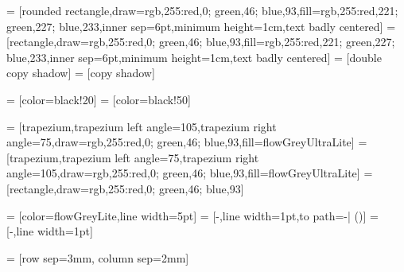 


\newcommand{\BYUblue}{rgb,255:red,0; green,46; blue,93}
\newcommand{\BYUbluelite}{rgb,255:red,221; green,227; blue,233}
\newcommand{\BYUbluemid}{rgb,255:red,151; green,169; blue,189}


 = [rounded rectangle,draw=\BYUblue,fill=\BYUbluelite,inner sep=6pt,minimum height=1cm,text badly centered]
 = [rectangle,draw=\BYUblue,fill=\BYUbluelite,inner sep=6pt,minimum height=1cm,text badly centered]
 = [double copy shadow]
 = [copy shadow]

 = [color=black!20]
 = [color=black!50]

 = [trapezium,trapezium left angle=105,trapezium right angle=75,draw=\BYUblue,fill=flowGreyUltraLite]
 = [trapezium,trapezium left angle=75,trapezium right angle=105,draw=\BYUblue,fill=flowGreyUltraLite]
 = [rectangle,draw=\BYUblue]

 = [color=flowGreyLite,line width=5pt]
 = [-,line width=1pt,to path={-| (\tikztotarget)}]
 = [-,line width=1pt]

 = [row sep=3mm, column sep=2mm]


\newcommand{\MultilineComponent}[3]
{
	\begin{minipage}{#1}
	\begin{center}
		#2 \linebreak #3
	\end{center}
	\end{minipage}
}

